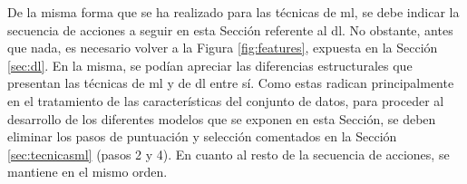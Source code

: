 De la misma forma que se ha realizado para las técnicas de \gls{ml}, se debe indicar la secuencia de acciones a seguir en esta Sección referente al \gls{dl}. No obstante, antes que nada, es necesario volver a la Figura \ref{fig:features}, expuesta en la Sección \ref{sec:dl}. En la misma, se podían apreciar las diferencias estructurales que presentan las técnicas de \gls{ml} y de \gls{dl} entre sí. Como estas radican principalmente en el tratamiento de las características del conjunto de datos, para proceder al desarrollo de los diferentes modelos que se exponen en esta Sección, se deben eliminar los pasos de puntuación y selección comentados en la Sección \ref{sec:tecnicasml} (pasos 2 y 4). En cuanto al resto de la secuencia de acciones, se mantiene en el mismo orden.





